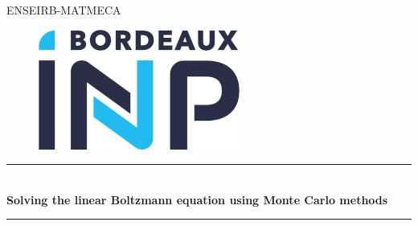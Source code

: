 \documentclass[a4paper, 11pt]{article}
\begin{document}
 
	
	
	\begin{titlepage} %
		\newcommand{\HRule}{\rule{\linewidth}{0.5mm}} %
		
		\centering %
		
		
		\textsc{\LARGE ENSEIRB-MATMECA}\\[1cm] %
		
		
		\begin{figure}[H]
			\begin{center}
				\includegraphics[scale=4]{logo ecole.jpg}
			\end{center}
		\end{figure}
		
		
		
		\vspace{1cm}
		
		\HRule\\[0.4cm]
		
		{\huge\bfseries Solving the linear Boltzmann equation using Monte Carlo methods }\\[0.4cm] %
		
		\HRule\\[1.5cm]
		
		{\huge\bfseries }
		

\end{titlepage}
\end{document}
